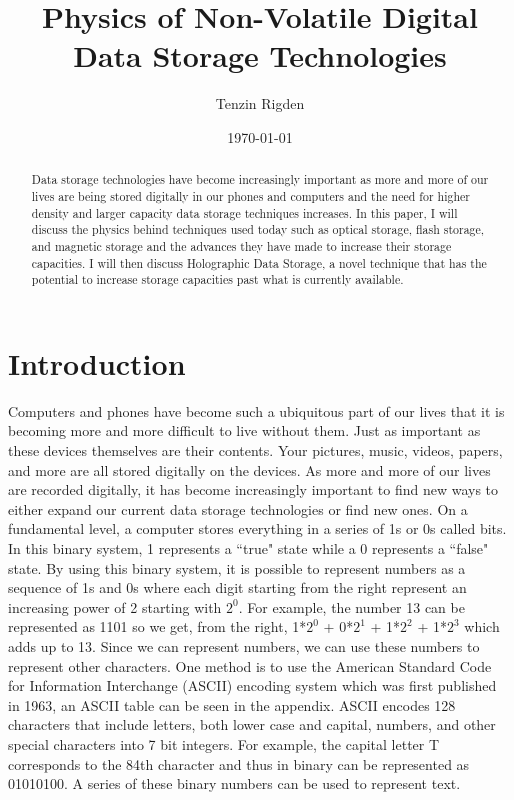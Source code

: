 \documentclass[ notitlepage, numerical, 11pt]{revtex4-1} %
\begin{document}
\title{Physics of Non-Volatile Digital Data Storage Technologies}
\author{Tenzin Rigden}
\date{\today}
\begin{abstract}
Data storage technologies have become increasingly important as more and more of our lives are being stored digitally in our phones and computers and the need for higher density and larger capacity data storage techniques increases. In this paper, I will discuss the physics behind techniques used today such as optical storage, flash storage, and magnetic storage and the advances they have made to increase their storage capacities. I will then discuss Holographic Data Storage, a novel technique that has the potential to increase storage capacities past what is currently available.

\end{abstract}

\maketitle
\section{Introduction}
Computers and phones have become such a ubiquitous part of our lives that it is becoming more and more difficult to live without them. Just as important as these devices themselves are their contents. Your pictures, music, videos, papers, and more are all stored digitally on the devices. As more and more of our lives are recorded digitally, it has become increasingly important to find new ways to either expand our current data storage technologies or find new ones. On a fundamental level, a computer stores everything in a series of 1s or 0s called bits. In this binary system, 1 represents a ``true" state while a 0 represents a ``false" state. By using this binary system, it is possible to represent numbers as a sequence of 1s and 0s where each digit starting from the right represent an increasing power of 2 starting with $2^0$. For example, the number 13 can be represented as 1101 so we get, from the right, 1*$2^0$ + 0*$2^1$ + 1*$2^2$ + 1*$2^3$ which adds up to 13. Since we can represent numbers, we can use these numbers to represent other characters. One method is to use the American Standard Code for Information Interchange (ASCII) encoding system which was first published in 1963, an ASCII table can be seen in the appendix. ASCII encodes 128 characters that include letters, both lower case and capital, numbers, and other special characters into 7 bit integers. For example, the capital letter T corresponds to the 84th character and thus in binary can be represented as 01010100. A series of these binary numbers can be used to represent text.
\end{document}
